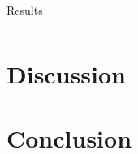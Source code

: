 \documentclass[11pt,a4paper]{article}
\begin{document}
  \begin{table}[H]
    \center
    \caption{Results}
    \begin{tabular}{ r | l  l l  r  r  r }
       
    \end{tabular}
    \label{tab:results}
  \end{table}


\section{\label{sect:discuss}Discussion}
\section{\label{sect:conclusion}Conclusion}


 




%
%
\end{document}
